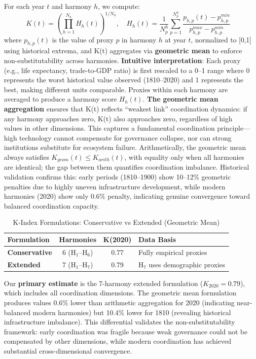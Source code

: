 \documentclass[11pt,letterpaper]{article}
\begin{document}
For each year $t$ and harmony $h$, we compute:
\begin{equation}
K(t) = \left( \prod_{h=1}^{N_h} H_h(t) \right)^{1/N_h}, \quad H_h(t) = \frac{1}{N_p^h} \sum_{p=1}^{N_p^h} \frac{p_{h,p}(t) - p_{h,p}^{min}}{p_{h,p}^{max} - p_{h,p}^{min}}
\label{eq:k-index}
\end{equation}
where $p_{h,p}(t)$ is the value of proxy $p$ in harmony $h$ at year $t$, normalized to [0,1] using historical extrema, and K(t) aggregates via \textbf{geometric mean} to enforce non-substitutability across harmonies. \textbf{Intuitive interpretation}: Each proxy (e.g., life expectancy, trade-to-GDP ratio) is first rescaled to a 0--1 range where 0 represents the worst historical value observed (1810--2020) and 1 represents the best, making different units comparable. Proxies within each harmony are averaged to produce a harmony score $H_h(t)$. \textbf{The geometric mean aggregation} ensures that K(t) reflects ``weakest link'' coordination dynamics: if any harmony approaches zero, K(t) also approaches zero, regardless of high values in other dimensions. This captures a fundamental coordination principle---high technology cannot compensate for governance collapse, nor can strong institutions substitute for ecosystem failure. Arithmetically, the geometric mean always satisfies $K_{geom}(t) \leq K_{arith}(t)$, with equality only when all harmonies are identical; the gap between them quantifies coordination imbalance. Historical validation confirms this: early periods (1810--1900) show 10--12\% geometric penalties due to highly uneven infrastructure development, while modern harmonies (2020) show only 0.6\% penalty, indicating genuine convergence toward balanced coordination capacity.

\begin{table}[h]
\centering
\caption{K-Index Formulations: Conservative vs Extended (Geometric Mean)}
\label{tab:k-formulations}
\begin{tabular}{lccl}
\toprule
\textbf{Formulation} & \textbf{Harmonies} & \textbf{K(2020)} & \textbf{Data Basis} \\
\midrule
\textbf{Conservative} & 6 (H$_1$--H$_6$) & 0.77 & Fully empirical proxies \\
\textbf{Extended} & 7 (H$_1$--H$_7$) & 0.79 & H$_7$ uses demographic proxies \\
\bottomrule
\end{tabular}
\end{table}

Our \textbf{primary estimate} is the 7-harmony extended formulation ($K_{2020}=0.79$), which includes all coordination dimensions. The geometric mean formulation produces values 0.6\% lower than arithmetic aggregation for 2020 (indicating near-balanced modern harmonies) but 10.4\% lower for 1810 (revealing historical infrastructure imbalance). This differential validates the non-substitutability framework: early coordination was fragile because weak governance could not be compensated by other dimensions, while modern coordination has achieved substantial cross-dimensional convergence.
\end{document}
